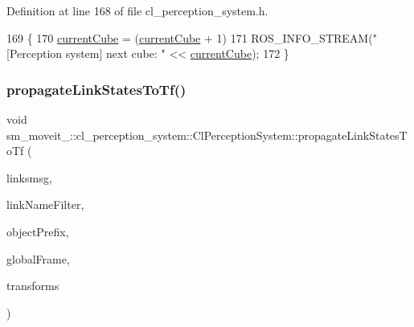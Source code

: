 Definition at line 168 of file cl\+\_\+perception\+\_\+system.\+h.


\begin{DoxyCode}
169   \{
170     \hyperlink{classsm__moveit__3_1_1cl__perception__system_1_1ClPerceptionSystem_ad915fc687481d4157ec40de52f8eaa82}{currentCube} = (\hyperlink{classsm__moveit__3_1_1cl__perception__system_1_1ClPerceptionSystem_ad915fc687481d4157ec40de52f8eaa82}{currentCube} + 1) %
171     ROS\_INFO\_STREAM(\textcolor{stringliteral}{"[Perception system] next cube: "} << \hyperlink{classsm__moveit__3_1_1cl__perception__system_1_1ClPerceptionSystem_ad915fc687481d4157ec40de52f8eaa82}{currentCube});
172   \}
\end{DoxyCode}
\mbox{\label{classsm__moveit__3_1_1cl__perception__system_1_1ClPerceptionSystem_a1084d40600fb5764c48447877a3683ef}} 
\subsubsection{\texorpdfstring{propagate\+Link\+States\+To\+Tf()}{propagateLinkStatesToTf()}}
{\footnotesize\ttfamily void sm\+\_\+moveit\+\_\+::cl\+\_\+perception\+\_\+system\+::\+Cl\+Perception\+System\+::propagate\+Link\+States\+To\+Tf (\begin{DoxyParamCaption}\item[{const gazebo\+\_\+msgs\+::\+Link\+States \&}]{linksmsg,  }\item[{std\+::string}]{link\+Name\+Filter,  }\item[{std\+::string}]{object\+Prefix,  }\item[{std\+::string}]{global\+Frame,  }\item[{std\+::vector$<$ tf\+::\+Stamped\+Transform $>$ \&}]{transforms }\end{DoxyParamCaption})\hspace{0.3cm}{\ttfamily [inline]}}



